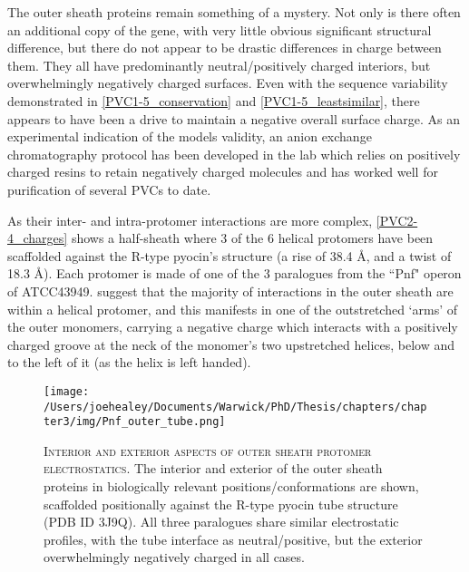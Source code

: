 The outer sheath proteins remain something of a mystery. Not only is there often an additional copy of the gene, with very little obvious significant structural difference, but there do not appear to be drastic differences in charge between them. They all have predominantly neutral/positively charged interiors, but overwhelmingly negatively charged surfaces. Even with the sequence variability demonstrated in \vref{PVC1-5_conservation} and \ref{PVC1-5_leastsimilar}, there appears to have been a drive to maintain a negative overall surface charge. As an experimental indication of the models validity, an anion exchange chromatography protocol has been developed in the lab which relies on positively charged resins to retain negatively charged molecules and has worked well for purification of several PVCs to date.

As their inter- and intra-protomer interactions are more complex, \vref{PVC2-4_charges} shows a half-sheath where 3 of the 6 helical protomers have been scaffolded against the R-type pyocin's structure (a rise of 38.4 \AA, and a twist of 18.3 \AA). Each protomer is made of one of the 3 paralogues from the ``Pnf" operon of ATCC43949. \cite{Ge2015} suggest that the majority of interactions in the outer sheath are within a helical protomer, and this manifests in one of the outstretched `arms' of the outer monomers, carrying a negative charge which interacts with a positively charged groove at the neck of the monomer's two upstretched helices, below and to the left of it (as the helix is left handed).

\begin{figure}[p]
 \centering
   \texttt{[image: /Users/joehealey/Documents/Warwick/PhD/Thesis/chapters/chapter3/img/Pnf\_outer\_tube.png]}
 \captionsetup{singlelinecheck=off, justification=justified, font=footnotesize, aboveskip=10pt}
 \caption[Electrostatic tube strata interfaces]{\textsc{\normalsize Interior and exterior aspects of outer sheath protomer electrostatics.}\vspace{0.1cm} \newline The interior and exterior of the outer sheath proteins in biologically relevant positions/conformations are shown, scaffolded positionally against the R-type pyocin tube structure (PDB ID 3J9Q). All three paralogues share similar electrostatic profiles, with the tube interface as neutral/positive, but the exterior overwhelmingly negatively charged in all cases.}
 \label{PVC2-4_charges}
\end{figure}

